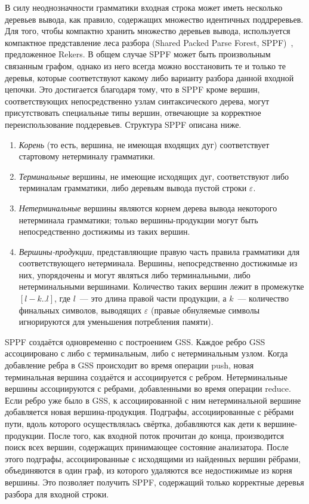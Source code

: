 В силу неоднозначности грамматики входная строка может иметь несколько деревьев вывода, как правило, содержащих множество идентичных поддреревьев. Для того, чтобы компактно хранить множество деревьев вывода, 
используется компактное представление леса разбора (Shared Packed Parse Forest, SPPF)~\cite{SPPF}, предложенное Rekers. В общем случае SPPF может быть произвольным связанным графом, однако из него всегда можно 
восстановить те и только те деревья, которые соответствуют какому либо варианту разбора данной входной цепочки. Это достигается благодаря тому, что в SPPF кроме вершин, соответствующих 
непосредственно узлам синтаксического дерева, могут присутствовать специальные типы вершин, отвечающие за корректное переиспользование поддеревьев. Структура SPPF описана ниже.
\begin{enumerate}
  \item \emph{Корень} (то есть, вершина, не имеющая входящих дуг) соответствует стартовому нетерминалу грамматики.
  \item \emph{Терминальные} вершины, не имеющие исходящих дуг, соответствуют либо терминалам грамматики, либо деревьям вывода пустой строки $\varepsilon$.
  \item \emph{Нетерминальные} вершины являются корнем дерева вывода некоторого нетерминала грамматики; только вершины-продукции могут быть непосредственно достижимы из таких вершин.
  \item \emph{Вершины-продукции}, представляющие правую часть правила грамматики для соответствующего нетерминала. Вершины, непосредственно достижимые из них, упорядочены и могут являться либо терминальными, либо нетерминальными вершинами. Количество таких вершин лежит в промежутке $[l-k..l]$, где $l$~--- это длина правой части продукции, а $k$~--- количество финальных символов, выводящих $\varepsilon$ (правые обнуляемые символы игнорируются для уменьшения потребления памяти).
\end{enumerate}

SPPF создаётся одновременно с построением GSS. Каждое ребро GSS ассоциировано с либо с терминальным, либо с нетерминальным узлом. Когда добавление ребра в GSS происходит во время операции push, новая терминальная вершина создаётся и ассоциируется с ребром. Нетерминальные вершины ассоциируются с ребрами, добавленными во время операции reduce. Если ребро уже было в GSS, к ассоциированной с ним нетерминальной вершине добавляется новая вершина-продукция. Подграфы, ассоциированные с рёбрами пути, вдоль которого осуществлялась свёртка, добавляются как дети к вершине-продукции. 
После того, как входной поток прочитан до конца, производится поиск всех вершин, содержащих принимающее состояние анализатора.
После этого подграфы, ассоциированные с исходящими из найденных вершин рёбрами, объединяются в один граф, из которого удаляются все недостижимые из корня вершины. Это позволяет получить SPPF, содержащий только корректные 
деревья разбора для входной строки. 

